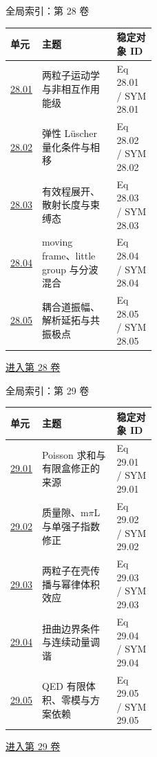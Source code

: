 \documentclass[aspectratio=169,10pt]{ctexbeamer}
\begin{document}
\begin{frame}[t]{全局索引：第 28 卷}
\small\begin{tabularx}{\linewidth}{p{0.15\linewidth}Yp{0.27\linewidth}}
\toprule 单元 & 主题 & 稳定对象 ID\\\midrule
\hyperlink{Fr:28.01-1}{28.01} & 两粒子运动学与非相互作用能级 & Eq 28.01 / SYM 28.01\\
\hyperlink{Fr:28.02-1}{28.02} & 弹性 Lüscher 量化条件与相移 & Eq 28.02 / SYM 28.02\\
\hyperlink{Fr:28.03-1}{28.03} & 有效程展开、散射长度与束缚态 & Eq 28.03 / SYM 28.03\\
\hyperlink{Fr:28.04-1}{28.04} & moving frame、little group 与分波混合 & Eq 28.04 / SYM 28.04\\
\hyperlink{Fr:28.05-1}{28.05} & 耦合道振幅、解析延拓与共振极点 & Eq 28.05 / SYM 28.05\\
\bottomrule\end{tabularx}
\vfill\hyperlink{Fr:V28-title}{进入第 28 卷}
\end{frame}

\begin{frame}[t]{全局索引：第 29 卷}
\small\begin{tabularx}{\linewidth}{p{0.15\linewidth}Yp{0.27\linewidth}}
\toprule 单元 & 主题 & 稳定对象 ID\\\midrule
\hyperlink{Fr:29.01-1}{29.01} & Poisson 求和与有限盒修正的来源 & Eq 29.01 / SYM 29.01\\
\hyperlink{Fr:29.02-1}{29.02} & 质量隙、m\ensuremath{\pi}L 与单强子指数修正 & Eq 29.02 / SYM 29.02\\
\hyperlink{Fr:29.03-1}{29.03} & 两粒子在壳传播与幂律体积效应 & Eq 29.03 / SYM 29.03\\
\hyperlink{Fr:29.04-1}{29.04} & 扭曲边界条件与连续动量调谐 & Eq 29.04 / SYM 29.04\\
\hyperlink{Fr:29.05-1}{29.05} & QED 有限体积、零模与方案依赖 & Eq 29.05 / SYM 29.05\\
\bottomrule\end{tabularx}
\vfill\hyperlink{Fr:V29-title}{进入第 29 卷}
\end{frame}
\end{document}
